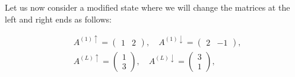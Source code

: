 \documentclass[12pt]{article}
\begin{document}
Let us now consider a modified state where we will change the matrices at the left and right ends as follows:


\begin{align*}
& A^{(1) \uparrow}=\left(\begin{array}{ll}
1 & 2
\end{array}\right), \quad A^{(1) \downarrow}=\left(\begin{array}{ll}
2 & -1
\end{array}\right),  \tag{30}\\
& A^{(L) \uparrow}=\left(\begin{array}{l}
1 \\
3
\end{array}\right), \quad A^{(L) \downarrow}=\left(\begin{array}{l}
3 \\
1
\end{array}\right), \tag{31}
\end{align*}
\end{document}
